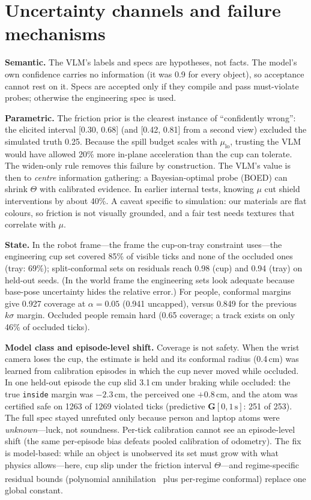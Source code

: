 \documentclass[10pt,twocolumn,letterpaper]{article}
\newcommand{\tv}{\textsuperscript{\dag}}  %
\begin{document}
\section{Uncertainty channels and failure mechanisms}\label{sec:uq}

\textbf{Semantic.} The VLM's labels and specs are hypotheses, not facts. The model's own confidence carries no information (it was 0.9 for
every object), so acceptance cannot rest on it. Specs are accepted only if they compile and pass must-violate probes; otherwise the
engineering spec is used.

\textbf{Parametric.} The friction prior is the clearest instance of ``confidently wrong'': the elicited interval [0.30, 0.68] (and
[0.42, 0.81] from a second view) excluded the simulated truth 0.25. Because the spill budget scales with $\mu_{\mathrm{lo}}$, trusting the
VLM would have allowed 20\% more in-plane acceleration than the cup can tolerate. The widen-only rule removes this failure by
construction. The VLM's value is then to \emph{centre} information gathering: a Bayesian-optimal probe (BOED) can shrink $\Theta$ with
calibrated evidence. In earlier internal tests, knowing $\mu$ cut shield interventions by about 40\%. A caveat specific to simulation:
our materials are flat colours, so friction is not visually grounded, and a fair test needs textures that correlate with $\mu$.

\textbf{State.} In the robot frame---the frame the cup-on-tray constraint uses---the engineering cup set covered 85\% of visible ticks and none of the occluded ones (tray: 69\%); split-conformal sets on residuals reach 0.98 (cup) and 0.94 (tray) on held-out seeds. (In the world frame the engineering sets look adequate because base-pose uncertainty hides the relative error.) For people, conformal margins give 0.927 coverage at $\alpha{=}0.05$ (0.941 uncapped), versus
0.849 for the previous $k\sigma$ margin. Occluded people remain hard (0.65 coverage; a track exists on only 46\% of occluded ticks).

\textbf{Model class and episode-level shift.} Coverage is not safety. When the wrist camera loses the cup, the estimate is held and its conformal radius (0.4\,cm) was learned from calibration episodes in which the cup never moved while occluded. In one held-out episode the cup slid 3.1\,cm under braking while occluded: the true \texttt{inside} margin was $-2.3$\,cm, the perceived one $+0.8$\,cm, and the atom was certified safe on 1263 of 1269 violated ticks (predictive $\mathbf{G}[0,1\,\mathrm{s}]$: 251 of 253). The full spec stayed unrefuted only because person and laptop atoms were \emph{unknown}---luck, not soundness. Per-tick calibration cannot see an episode-level shift (the same per-episode bias defeats pooled calibration of odometry). The fix is model-based: while an object is unobserved its set must grow with what physics allows---here, cup slip under the friction interval $\Theta$---and regime-specific residual bounds (polynomial annihilation~\cite{pa}\tv{} plus per-regime conformal) replace one global constant.
\end{document}
